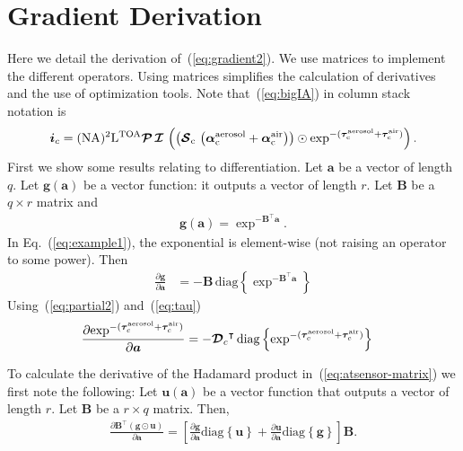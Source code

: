 \documentclass[10pt,twocolumn,letterpaper]{article}
\newcommand{\OpSphere}{\bm{\mathcal{S}}}
\newcommand{\OpDistance}{\bm{\mathcal{D}}}
\newcommand{\OpInt}{\bm{\mathcal{I}}}
\newcommand{\OpCamera}{\bm{\mathcal{P}}}
\newcommand{\OpDiag}[1]{\mathrm{diag}\left\{#1\right\}}
\newcommand{\roundy}[1]{\left(#1\right)}
\newcommand{\PartDeriv}[2]{\frac{\partial{#1}}{\partial{#2}}}
\newcommand{\vect}[1]{\bm{#1}}
\newcommand{\mat}[1]{\bm{#1}}
\newcommand{\transpose}[1]{{#1}^\intercal}
\begin{document}
\appendix

\section{Gradient Derivation}
\label{sec:gradient-derivation}

Here we detail the derivation of~(\ref{eq:gradient2}).  We use
matrices to implement the different operators. Using matrices
simplifies the calculation of derivatives and the use of optimization
tools. Note that~(\ref{eq:bigIA}) in column stack notation is
\begin{align}
  \vect{i}_c=(\rm{NA})^2\mathrm{L}^{\rm TOA} \OpCamera \, \OpInt \,
  \roundy{ \roundy {\OpSphere_c \, \roundy{\vect{\alpha}^{\rm
          aerosol}_c + \vect{\alpha}^{\rm air}_c} } \odot
    \exp^{-(\vect{\tau}^{\rm aerosol}_c + \vect{\tau}^{\rm air}_c)}}.
  \label{eq:atsensor-matrix}
\end{align}
First we show some results relating to differentiation. Let $\vect{a}$
be a vector of length $q$. Let $\vect{g}(\vect{a})$ be a vector
function: it outputs a vector of length $r$. Let $\mat{B}$ be a $q
\times r$ matrix and
\begin{align}
  \vect{g}(\vect{a}) = \exp^{-\transpose{\mat{B}}\vect{a}}.
  \label{eq:example1}
\end{align}
In Eq.~(\ref{eq:example1}), the exponential is element-wise (not
raising an operator to some power). Then
\begin{align}
  \label{eq:partial2}
  \PartDeriv{\vect{g}}{\vect{a}} &= - \mat{B} \,
  \OpDiag{\exp^{-\transpose{\mat{B}}\vect{a}}}
\end{align}
Using~(\ref{eq:partial2}) and~(\ref{eq:tau})
\begin{align}
  \label{eq:partial4}
  \PartDeriv{\exp^{-(\vect{\tau}^{\rm aerosol}_c + \vect{\tau}^{\rm
        air}_c)}}{\vect{a}} &= - \transpose{\OpDistance_c} \,
  \OpDiag{\exp^{-(\vect{\tau}^{\rm aerosol}_c + \vect{\tau}^{\rm
        air}_c)}}
\end{align}

To calculate the derivative of the Hadamard product
in~(\ref{eq:atsensor-matrix}) we first note the following: Let
$\vect{u}(\vect{a})$ be a vector function that outputs a vector of
length $r$. Let $\mat{B}$ be a $r \times q$ matrix. Then,
\begin{align}
  \label{eq:partial1}
  \PartDeriv{\transpose{\mat{B}} (\vect{g} \odot \vect{u})}{\vect{a}}
  = \left[ \PartDeriv{\vect{g}}{\vect{a}} \OpDiag{\vect{u}} +
    \PartDeriv{\vect{u}}{\vect{a}} \OpDiag{\vect{g}} \right]
  \mat{B}.
\end{align}
%
%
\end{document}
